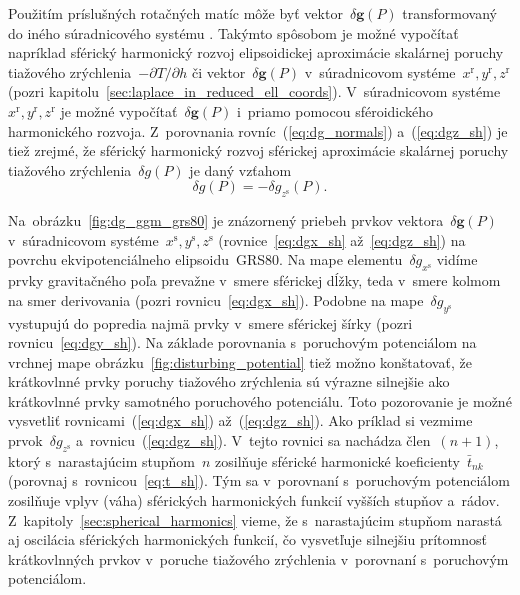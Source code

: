 \documentclass[a4paper, 12pt]{book}
\let\vec\mathbf
\begin{document}
Použitím príslušných rotačných matíc môže byť vektor~$\delta \vec g(P)$ 
transformovaný do iného súradnicového systému \parencite[pozri 
napríklad][]{WGS84}.  Takýmto spôsobom je možné vypočítať napríklad sférický 
harmonický rozvoj elipsoidickej aproximácie skalárnej poruchy tiažového 
zrýchlenia~$-\partial T \slash \partial h$ či vektor~$\delta \vec g(P)$ 
v~súradnicovom systéme~$x^\mathrm{r}, y^\mathrm{r}, z^\mathrm{r}$ (pozri 
kapitolu~\ref{sec:laplace_in_reduced_ell_coords}).  V~súradnicovom 
systéme~$x^\mathrm{r}, y^\mathrm{r}, z^\mathrm{r}$ je možné vypočítať~$\delta 
\vec g(P)$ i~priamo pomocou sféroidického harmonického rozvoja.  Z~porovnania 
rovníc~(\ref{eq:dg_normals}) a~(\ref{eq:dgz_sh}) je tiež zrejmé, že sférický 
harmonický rozvoj sférickej aproximácie skalárnej poruchy tiažového 
zrýchlenia~$\delta g(P)$ je daný vzťahom
%
\begin{equation}
\label{eq:dg_sh_sa}
\delta g(P) = -\delta g_{z^\mathrm{s}}(P){.}
\end{equation}

Na~obrázku~\ref{fig:dg_ggm_grs80} je znázornený priebeh prvkov vektora~$\delta 
\vec g(P)$ v~súradnicovom systéme~$x^\mathrm{s}, y^\mathrm{s}, z^\mathrm{s}$ 
(rovnice~\ref{eq:dgx_sh} až~\ref{eq:dgz_sh}) na povrchu ekvipotenciálneho 
elipsoidu~GRS80.  Na mape elementu~$\delta g_{x^\mathrm{s}}$ vidíme prvky 
gravitačného poľa prevažne v~smere sférickej dĺžky, teda v~smere kolmom na smer 
derivovania (pozri rovnicu~\ref{eq:dgx_sh}).  Podobne na mape~$\delta 
g_{y^\mathrm{s}}$ vystupujú do popredia najmä prvky v~smere sférickej šírky 
(pozri rovnicu~\ref{eq:dgy_sh}).  Na základe porovnania s~poruchovým 
potenciálom na vrchnej mape obrázku~\ref{fig:disturbing_potential} tiež možno 
konštatovať, že krátkovlnné prvky poruchy tiažového zrýchlenia sú výrazne 
silnejšie ako krátkovlnné prvky samotného poruchového potenciálu.  Toto 
pozorovanie je možné vysvetliť rovnicami~(\ref{eq:dgx_sh}) 
až~(\ref{eq:dgz_sh}).  Ako príklad si vezmime prvok~$\delta g_{z^\mathrm{s}}$ 
a~rovnicu~(\ref{eq:dgz_sh}).  V~tejto rovnici sa nachádza člen~$(n + 1)$, ktorý 
s~narastajúcim stupňom~$n$ zosilňuje sférické harmonické 
koeficienty~$\bar{t}_{nk}$ (porovnaj s~rovnicou~\ref{eq:t_sh}).  Tým sa 
v~porovnaní s~poruchovým potenciálom zosilňuje vplyv (váha) sférických 
harmonických funkcií vyšších stupňov a~rádov.  
Z~kapitoly~\ref{sec:spherical_harmonics} vieme, že s~narastajúcim stupňom 
narastá aj oscilácia sférických harmonických funkcií, čo vysvetľuje silnejšiu 
prítomnosť krátkovlnných prvkov v~poruche tiažového zrýchlenia v~porovnaní 
s~poruchovým potenciálom.
\end{document}
